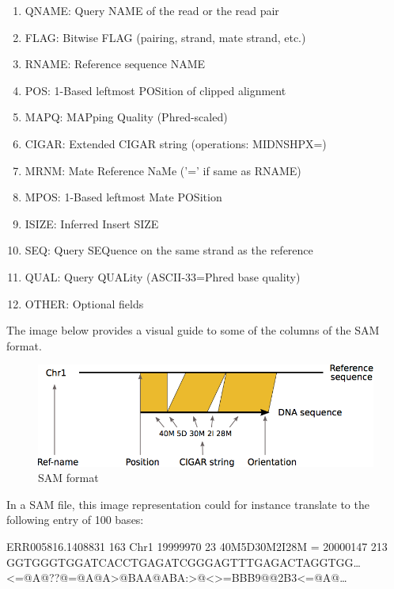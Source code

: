 \documentclass[11pt]{article}
\makeatletter
\def\maxwidth{\ifdim\Gin@nat@width>\linewidth\linewidth
    \else\Gin@nat@width\fi}
\let\Oldincludegraphics\includegraphics
\renewcommand{\includegraphics}[1]{\Oldincludegraphics[width=.8\maxwidth, height=.55\textheight, keepaspectratio]{#1}}
\providecommand{\tightlist}{%
      \setlength{\itemsep}{0pt}\setlength{\parskip}{0pt}}
\makeatother
\begin{document}
\begin{enumerate}
\def\labelenumi{\arabic{enumi}.}
\tightlist
\item
  QNAME: Query NAME of the read or the read pair
\item
  FLAG: Bitwise FLAG (pairing, strand, mate strand, etc.)
\item
  RNAME: Reference sequence NAME
\item
  POS: 1-Based leftmost POSition of clipped alignment
\item
  MAPQ: MAPping Quality (Phred-scaled)
\item
  CIGAR: Extended CIGAR string (operations: MIDNSHPX=)
\item
  MRNM: Mate Reference NaMe ('=' if same as RNAME)
\item
  MPOS: 1-Based leftmost Mate POSition
\item
  ISIZE: Inferred Insert SIZE
\item
  SEQ: Query SEQuence on the same strand as the reference
\item
  QUAL: Query QUALity (ASCII-33=Phred base quality)
\item
  OTHER: Optional fields
\end{enumerate}

The image below provides a visual guide to some of the columns of the
SAM format.

    \begin{figure}[!h]
\centering
\includegraphics{img/SAM_BAM.png}
\caption{SAM format}
\end{figure}



\newpage



    In a SAM file, this image representation could for instance translate to
the following entry of 100 bases:

ERR005816.1408831 163 Chr1 19999970 23 40M5D30M2I28M = 20000147 213
GGTGGGTGGATCACCTGAGATCGGGAGTTTGAGACTAGGTGG\ldots{}\\
\textless{}=@A@??@=@A@A\textgreater{}@BAA@ABA:\textgreater{}@\textless{}\textgreater{}=BBB9@@2B3\textless{}=@A@\ldots{}
\end{document}

